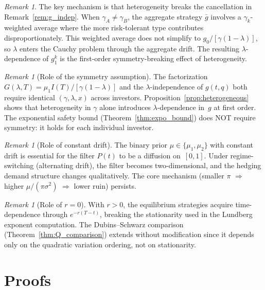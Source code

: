 \documentclass[12pt]{article}
\theoremstyle{remark}
\newtheorem{remark}[theorem]{Remark}
\theoremstyle{definition}
\begin{document}
\begin{remark}\label{rem:hetero_mechanism}
The key mechanism is that heterogeneity breaks the cancellation in
Remark~\ref{rem:g_indep}.
When $\gamma_A \neq \gamma_B$, the aggregate strategy $\bar{g}$
involves a $\gamma_k$-weighted average where the more risk-tolerant
type contributes disproportionately.
This weighted average does not simplify to $g_0/[\gamma(1-\lambda)]$,
so $\lambda$ enters the Cauchy problem through the aggregate drift.
The resulting $\lambda$-dependence of $g_1^k$ is the first-order
symmetry-breaking effect of heterogeneity.
\end{remark}

\begin{remark}[Role of the symmetry assumption]\label{rem:symmetry_role}
The factorization $G(\lambda,T) = \mu_1 I(T)/[\gamma(1-\lambda)]$
and the $\lambda$-independence of $g(t,q)$ both require identical
$(\gamma, \lambda, x)$ across investors.
Proposition~\ref{prop:heterogeneous} shows that heterogeneity in
$\gamma$ alone introduces $\lambda$-dependence in~$g$ at first order.
The exponential safety bound (Theorem~\ref{thm:expo_bound}) does NOT
require symmetry: it holds for each individual investor.
\end{remark}

\begin{remark}[Role of constant drift]\label{rem:constant_drift}
The binary prior $\mu \in \{\mu_1, \mu_2\}$ with constant drift is
essential for the filter $P(t)$ to be a diffusion on~$[0,1]$.
Under regime-switching (alternating drift), the filter becomes
two-dimensional, and the hedging demand structure changes qualitatively.
The core mechanism (smaller $\pi$ $\Rightarrow$ higher
$\mu/(\pi\sigma^2)$ $\Rightarrow$ lower ruin) persists.
\end{remark}

\begin{remark}[Role of $r = 0$]\label{rem:zero_rate}
With $r > 0$, the equilibrium strategies acquire time-dependence
through $e^{-r(T-t)}$, breaking the stationarity used in the
Lundberg exponent computation.
The Dubins--Schwarz comparison (Theorem~\ref{thm:Q_comparison})
extends without modification since it depends only on the quadratic
variation ordering, not on stationarity.
\end{remark}

\section{Proofs}\label{sec:proofs}
\end{document}
